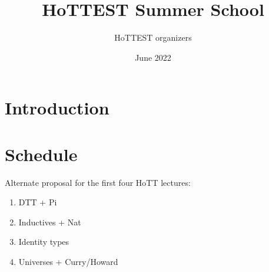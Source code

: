 \documentclass{article}
\title{HoTTEST Summer School}
\author{HoTTEST organizers}
\date{June 2022}
\begin{document}
\maketitle

\section{Introduction}

\section{Schedule}

Alternate proposal for the first four HoTT lectures:
\begin{enumerate}
\item DTT + Pi
\item Inductives + Nat
\item Identity types
\item Universes + Curry/Howard 
\end{enumerate}
\end{document}
